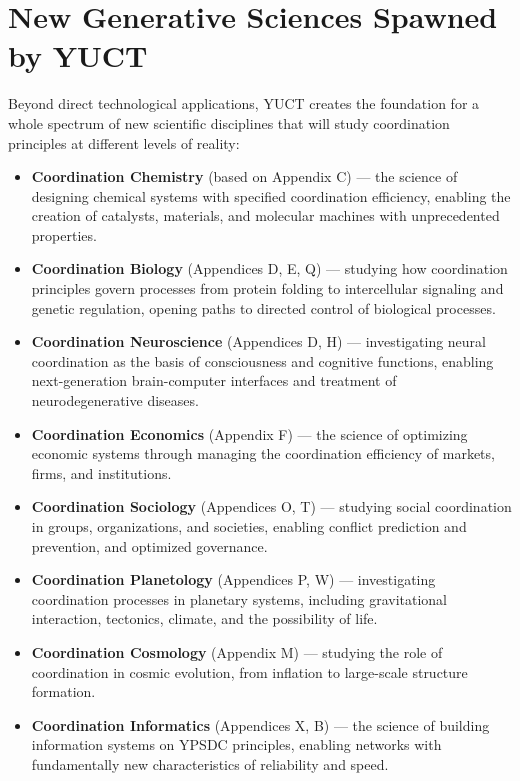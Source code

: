 \documentclass[12pt,a4paper]{article}
\theoremstyle{remark}
\begin{document}
	\section{New Generative Sciences Spawned by YUCT}
	\label{sec:generative}
	
	Beyond direct technological applications, YUCT creates the foundation for a whole spectrum of new scientific disciplines that will study coordination principles at different levels of reality:
	
	\begin{itemize}[leftmargin=*]
		\item \textbf{Coordination Chemistry} (based on Appendix C) — the science of designing chemical systems with specified coordination efficiency, enabling the creation of catalysts, materials, and molecular machines with unprecedented properties.
		
		\item \textbf{Coordination Biology} (Appendices D, E, Q) — studying how coordination principles govern processes from protein folding to intercellular signaling and genetic regulation, opening paths to directed control of biological processes.
		
		\item \textbf{Coordination Neuroscience} (Appendices D, H) — investigating neural coordination as the basis of consciousness and cognitive functions, enabling next-generation brain-computer interfaces and treatment of neurodegenerative diseases.
		
		\item \textbf{Coordination Economics} (Appendix F) — the science of optimizing economic systems through managing the coordination efficiency of markets, firms, and institutions.
		
		\item \textbf{Coordination Sociology} (Appendices O, T) — studying social coordination in groups, organizations, and societies, enabling conflict prediction and prevention, and optimized governance.
		
		\item \textbf{Coordination Planetology} (Appendices P, W) — investigating coordination processes in planetary systems, including gravitational interaction, tectonics, climate, and the possibility of life.
		
		\item \textbf{Coordination Cosmology} (Appendix M) — studying the role of coordination in cosmic evolution, from inflation to large-scale structure formation.
		
		\item \textbf{Coordination Informatics} (Appendices X, B) — the science of building information systems on YPSDC principles, enabling networks with fundamentally new characteristics of reliability and speed.
	\end{itemize}
	
\end{document}
